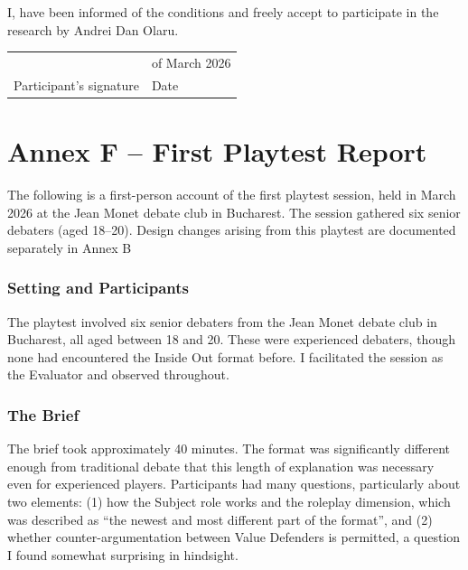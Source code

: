 \documentclass[12pt]{article}
\begin{document}
\bigskip\bigskip

I, \underline{\hspace{7cm}} have been informed of the conditions and freely accept to participate in the research by Andrei Dan Olaru.

\bigskip

\noindent
\begin{tabular}{p{6cm} p{5cm}}
\underline{\hspace{6cm}} & \underline{\hspace{3cm}} of March 2026 \\
Participant's signature & Date \\
\end{tabular}


\newpage

\section*{Annex F -- First Playtest Report}

The following is a first-person account of the first playtest session, held in March 2026 at the Jean Monet debate club in Bucharest. The session gathered six senior debaters (aged 18--20). Design changes arising from this playtest are documented separately in Annex B

\subsubsection{Setting and Participants}

The playtest involved six senior debaters from the Jean Monet debate club in Bucharest, all aged between 18 and 20. These were experienced debaters, though none had encountered the Inside Out format before. I facilitated the session as the Evaluator and observed throughout.

\subsubsection{The Brief}

The brief took approximately 40 minutes. The format was significantly different enough from traditional debate that this length of explanation was necessary even for experienced players. Participants had many questions, particularly about two elements: (1) how the Subject role works and the roleplay dimension, which was described as ``the newest and most different part of the format'', and (2) whether counter-argumentation between Value Defenders is permitted, a question I found somewhat surprising in hindsight.
\end{document}
